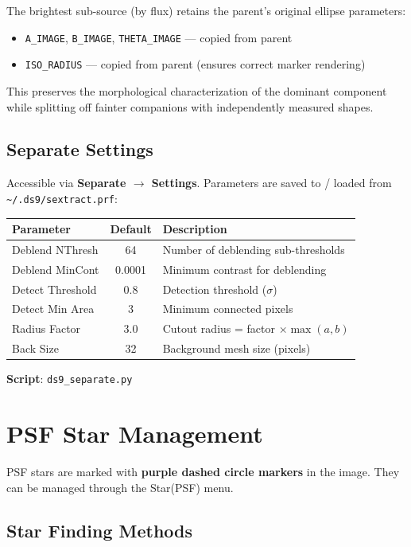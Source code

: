 \documentclass[11pt,fleqn]{book}
\begin{document}
The brightest sub-source (by flux) retains the parent's original ellipse parameters:
\begin{itemize}[leftmargin=2em]
  \item \texttt{A\_IMAGE}, \texttt{B\_IMAGE}, \texttt{THETA\_IMAGE} --- copied from parent
  \item \texttt{ISO\_RADIUS} --- copied from parent (ensures correct marker rendering)
\end{itemize}

This preserves the morphological characterization of the dominant component while splitting off fainter companions with independently measured shapes.

\subsection{Separate Settings}

Accessible via \textbf{Separate $\to$ Settings}. Parameters are saved to / loaded from \texttt{\textasciitilde/.ds9/sextract.prf}:

\begin{center}
\begin{tabular}{lcp{7cm}}
\toprule
\textbf{Parameter} & \textbf{Default} & \textbf{Description} \\
\midrule
Deblend NThresh & 64 & Number of deblending sub-thresholds \\
Deblend MinCont & 0.0001 & Minimum contrast for deblending \\
Detect Threshold & 0.8 & Detection threshold ($\sigma$) \\
Detect Min Area & 3 & Minimum connected pixels \\
Radius Factor & 3.0 & Cutout radius = factor $\times \max(a, b)$ \\
Back Size & 32 & Background mesh size (pixels) \\
\bottomrule
\end{tabular}
\end{center}

\textbf{Script}: \texttt{ds9\_separate.py}


\section{PSF Star Management}

PSF stars are marked with \textbf{purple dashed circle markers} in the image. They can be managed through the Star(PSF) menu.

\subsection{Star Finding Methods}
\end{document}

